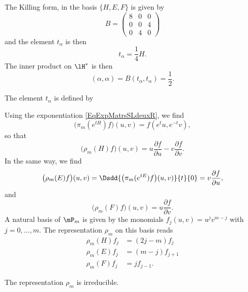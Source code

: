 The Killing form, in the basis \( \{ H,E,F \}\) is given by
\begin{equation}
    B=\begin{pmatrix}
        8    &   0    &   0    \\
        0    &   0    &   4    \\
        0    &   4    &   0
    \end{pmatrix}
\end{equation}
and the element \( t_{\alpha}\) is then
\begin{equation}
    t_{\alpha}=\frac{1}{ 4 }H.
\end{equation}
The inner product on \( \lH^*\) is then
\begin{equation}        \label{Eqinnerhstarsldc}
    (\alpha,\alpha)=B(t_{\alpha},t_{\alpha})=\frac{ 1 }{2}.
\end{equation}

The element \( t_{\alpha}\) is defined by 

Using the exponentiation \eqref{EqExpMatrsSLdeuxR}, we find
\[ 
    \big( \pi_m( e^{tH})f \big)(u,v)=f( e^{t}u, e^{-t}v),
\]
so that
\begin{equation}
    \big( \rho_m(H)f \big)(u,v)=u\frac{ \partial f }{ \partial u }-v\frac{ \partial f }{ \partial v }.
\end{equation}
In the same way, we find
\begin{equation}
    \big( \rho_m(E)f \big)(u,v)=\Dsdd{ \big( \pi_m( e^{tE})f \big)(u,v) }{t}{0}=v\frac{ \partial f }{ \partial u },
\end{equation}
and
\begin{equation}
     \big( \rho_m(F)f \big)(u,v)=u \frac{ \partial f }{ \partial v }.
\end{equation}
A natural basis of $\mP_m$ is given by the monomials $f_j(u,v)=u^jv^{m-j}$ with $j=0,\ldots,m$. The representation $\rho_m$ on this basis reads
\begin{equation}        \label{EqReprezgsldeuxC}
\begin{split}
    \rho_m(H)f_j&=(2j-m)f_j\\
    \rho_m(E)f_j&=(m-j)f_{j+1}\\
    \rho_m(F)f_j&=jf_{j-1}.
\end{split}
\end{equation}

\begin{proposition}     \label{ProprhomirredsldeuxC}
The representation $\rho_m$ is irreducible.
\end{proposition}

